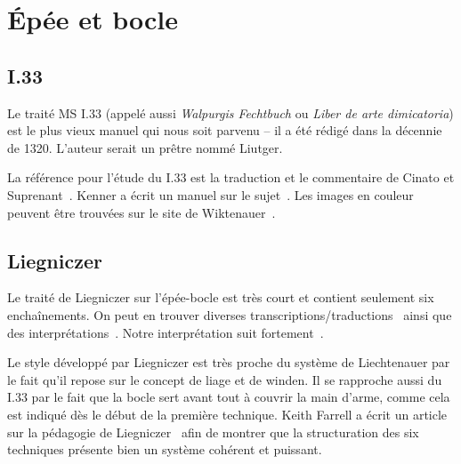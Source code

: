 \chapter{Épée et bocle}





\section{I.33}



Le traité MS I.33 (appelé aussi \emph{Walpurgis Fechtbuch} ou \emph{Liber de arte dimicatoria}) est le plus vieux manuel qui nous soit parvenu – il a été rédigé dans la décennie de 1320.
L'auteur serait un prêtre nommé Liutger.

La référence pour l'étude du I.33 est la traduction et le commentaire de Cinato et Suprenant~\cite{cinato:I33:2009}.
Kenner a écrit un manuel sur le sujet~\cite{kenner:I33:2014}.
Les images en couleur peuvent être trouvées sur le site de Wiktenauer~\cite{wiktenauer:I33}.


\section{Liegniczer}


Le traité de Liegniczer sur l'épée-bocle est très court et contient seulement six enchaînements.
On peut en trouver diverses transcriptions/traductions~\cite{ardamhe:liegniczer, farrell:liegnieczer, lindholm:ringeck_others:2006} ainsi que des interprétations~\cite{farrell:pedagogy_liegnieczer:2014, youtube:sala_armi:liegniczer, youtube:memag:liegniczer, lindholm:ringeck_others:2006, Myers:LiegniczerBuckler, knight:epee_bocle}.
Notre interprétation suit fortement~\cite{youtube:sala_armi:liegniczer, youtube:memag:liegniczer, farrell:pedagogy_liegnieczer:2014}.

Le style développé par Liegniczer est très proche du système de Liechtenauer par le fait qu'il repose sur le concept de liage et de winden.
Il se rapproche aussi du I.33 par le fait que la bocle sert avant tout à couvrir la main d'arme, comme cela est indiqué dès le début de la première technique.
Keith Farrell a écrit un article sur la pédagogie de Liegniczer~\cite{farrell:pedagogy_liegnieczer:2014} afin de montrer que la structuration des six techniques présente bien un système cohérent et puissant.

